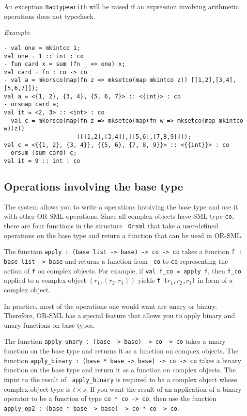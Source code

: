 An exception {\tt Badtypearith} will be raised if an expression
involving arithmetic operations does not typecheck.

{\em Example}:

{\small \begin{verbatim}
- val one = mkintco 1;
val one = 1 :: int : co
- fun card x = sum (fn _ => one) x;
val card = fn : co -> co
- val a = mkorsco(map(fn z => mksetco(map mkintco z)) [[1,2],[3,4],[5,6,7]]);
val a = <{1, 2}, {3, 4}, {5, 6, 7}> :: <{int}> : co
- orsmap card a;
val it = <2, 3> :: <int> : co
- val c = mkorsco(map(fn z => mksetco(map(fn w => mksetco(map mkintco w))z))
                     [[[1,2],[3,4]],[[5,6],[7,8,9]]]);
val c = <{{1, 2}, {3, 4}}, {{5, 6}, {7, 8, 9}}> :: <{{int}}> : co
- orsum (sum card) c;
val it = 9 :: int : co
\end{verbatim} }

\subsection{Operations involving the base type}

The system allows you to write a operations involving the base type
and use it with other OR-SML operations. Since all complex objects
have SML type {\tt co}, there are four functions in the structure {\tt
Orsml} that take a user-defined operations on the base type and return
a function that can be used in OR-SML.

The function {\tt apply : (base list -> base) -> co -> co} takes a
function {\tt f : base list -> base} and returns a function from {\tt
co} to {\tt co} representing the action of {\tt f} on complex objects.
For example, if {\tt val f\_co = apply f}, then {\tt f\_co} applied to
a complex object $(r_1,(r_2,r_3))$ yields {\tt f [$r_1$,$r_2$,$r_3$]}
in form of a complex object.

In practice, most of the operations one would want are unary or
binary.  Therefore, OR-SML has a special feature that allows you to
apply binary and unary functions on base types. 

The function {\tt apply\_unary : (base -> base) -> co -> co} takes a
unary function on the base type and returns it as a function on complex
objects. The function {\tt apply\_binary : (base * base -> base) ->
co -> co} takes a binary function on the base type and return it as a
function on complex objects. The input to the result of {\tt
apply\_binary}  is required to be a complex object whose complex
object type is $t \times s$. If you want the result of an application
of a binary operator to be a function of type {\tt co * co -> co},
then use the function {\tt  apply\_op2 : (base * base -> base) -> co *
co -> co}.

